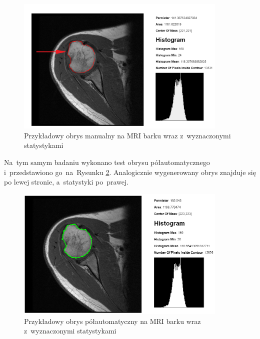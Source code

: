 \documentclass[a4paper,11pt,twoside,openright]{report}
\theoremstyle{definition}
\begin{document}
\pagebreak



\begin{figure}[h!]
	\center
	\includegraphics[width=0.9\textwidth]{105b}
	\caption{Przykładowy obrys manualny na MRI barku wraz z~wyznaczonymi statystykami}
    	\label{fig:105}
\end{figure}

Na~tym samym badaniu wykonano test obrysu półautomatycznego i~przedstawiono
go~na~Rysunku \ref{fig:107}. Analogicznie wygenerowany obrys znajduje się po lewej stronie,
a~statystyki po~prawej.

\begin{figure}[h!]
	\center
	\includegraphics[width=0.9\textwidth]{107}
	\caption{Przykładowy obrys półautomatyczny na MRI barku
	wraz z~wyznaczonymi statystykami}
    	\label{fig:107}
\end{figure}
\end{document}
